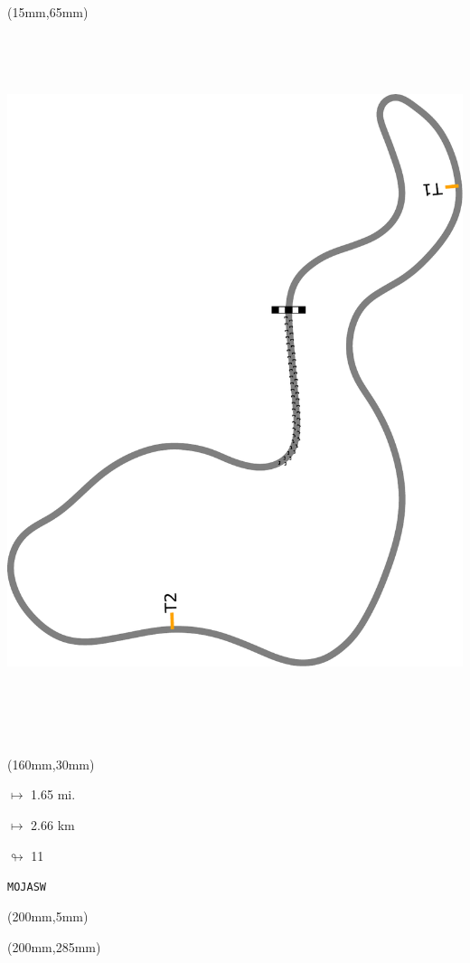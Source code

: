 \begin{textblock*}{185mm}(15mm,65mm)%
\centering
\mbox{\includegraphics[width=185mm,height=210mm,keepaspectratio]{PT/MOJASW.pdf}}
\end{textblock*}
\begin{textblock*}{40mm}(160mm,30mm)%
\Large
\par$\mapsto$ 1.65 mi.
\par$\mapsto$ 2.66 km
\par$\looparrowright$ 11
\par\hfill\tiny\tt MOJASW\\
\end{textblock*}
\begin{textblock*}{20mm}(200mm,5mm)%
\fbox{\thepage}
\label{MOJASW}
\end{textblock*}
\begin{textblock*}{20mm}(200mm,285mm)%
\fbox{\thepage}
\end{textblock*}

